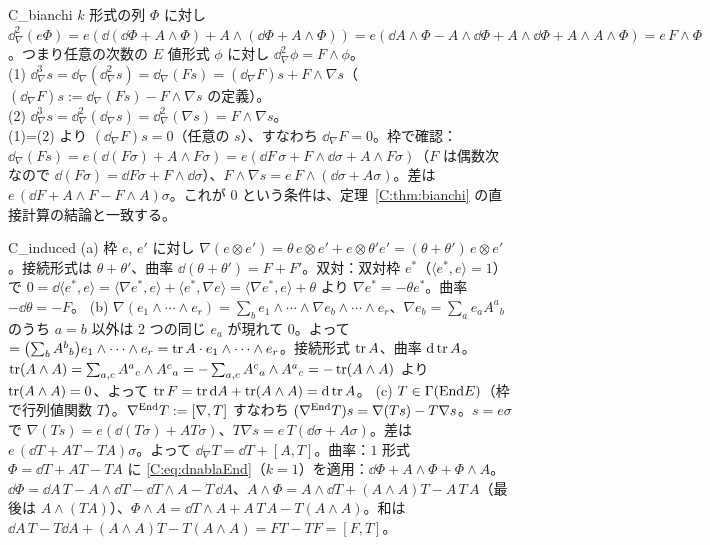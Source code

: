 \begin{soll}{C_bianchi}
$k$ 形式の列 $\Phi$ に対し $\dd_\nabla^2(e\Phi)=e(\dd(\dd\Phi+A\wedge\Phi)+A\wedge(\dd\Phi+A\wedge\Phi))=e(\dd A\wedge\Phi-A\wedge\dd\Phi+A\wedge\dd\Phi+A\wedge A\wedge\Phi)=e\,F\wedge\Phi$。つまり任意の次数の $E$ 値形式 $\phi$ に対し $\dd_\nabla^2\phi=F\wedge\phi$。\\
(1) $\dd_\nabla^3s=\dd_\nabla(\dd_\nabla^2s)=\dd_\nabla(Fs)=(\dd_\nabla F)s+F\wedge\nabla s$（$(\dd_\nabla F)s:=\dd_\nabla(Fs)-F\wedge\nabla s$ の定義）。\\
(2) $\dd_\nabla^3s=\dd_\nabla^2(\dd_\nabla s)=\dd_\nabla^2(\nabla s)=F\wedge\nabla s$。\\
(1)=(2) より $(\dd_\nabla F)s=0$（任意の $s$）、すなわち $\dd_\nabla F=0$。枠で確認：$\dd_\nabla(Fs)=e(\dd(F\sigma)+A\wedge F\sigma)=e(\dd F\,\sigma+F\wedge\dd\sigma+A\wedge F\sigma)$（$F$ は偶数次なので $\dd(F\sigma)=\dd F\sigma+F\wedge\dd\sigma$）、$F\wedge\nabla s=e\,F\wedge(\dd\sigma+A\sigma)$。差は $e\,(\dd F+A\wedge F-F\wedge A)\sigma$。これが $0$ という条件は、定理~\ref{C:thm:bianchi} の直接計算の結論と一致する。
\end{soll}

\begin{soll}{C_induced}
(a) 枠 $e$, $e'$ に対し $\nabla(e\otimes e')=\theta\,e\otimes e'+e\otimes\theta'e'=(\theta+\theta')\,e\otimes e'$。接続形式は $\theta+\theta'$、曲率 $\dd(\theta+\theta')=F+F'$。双対：双対枠 $e^*$（$\langle e^*,e\rangle=1$）で $0=\dd\langle e^*,e\rangle=\langle\nabla e^*,e\rangle+\langle e^*,\nabla e\rangle=\langle\nabla e^*,e\rangle+\theta$ より $\nabla e^*=-\theta e^*$。曲率 $-\dd\theta=-F$。
(b) $\nabla(e_1\wedge\cdots\wedge e_r)=\sum_be_1\wedge\cdots\wedge\nabla e_b\wedge\cdots\wedge e_r$、$\nabla e_b=\sum_ae_aA^a{}_b$ のうち $a=b$ 以外は 2 つの同じ $e_a$ が現れて $0$。よって $=\bigl(\sum_bA^b{}_b\bigr)e_1\wedge\cdots\wedge e_r=\operatorname{tr} A\cdot e_1\wedge\cdots\wedge e_r$。接続形式 $\operatorname{tr} A$、曲率 $\mathrm{d}\operatorname{tr} A$。$\operatorname{tr}(A\wedge A)=\sum_{a,c}A^a{}_c\wedge A^c{}_a=-\sum_{a,c}A^c{}_a\wedge A^a{}_c=-\operatorname{tr}(A\wedge A)$ より $\operatorname{tr}(A\wedge A)=0$、よって $\operatorname{tr} F=\operatorname{tr}\mathrm{d} A+\operatorname{tr}(A\wedge A)=\mathrm{d}\operatorname{tr} A$。
(c) $T\in\Gamma(\mathrm{End} E)$（枠で行列値関数 $T$）。$\nabla^{\mathrm{End}}T:=[\nabla,T]$ すなわち $(\nabla^{\mathrm{End}}T)s=\nabla(Ts)-T\nabla s$。$s=e\sigma$ で $\nabla(Ts)=e(\dd(T\sigma)+AT\sigma)$、$T\nabla s=e\,T(\dd\sigma+A\sigma)$。差は $e\,(\dd T+AT-TA)\sigma$。よって $\dd_\nabla T=\dd T+[A,T]$。曲率：$1$ 形式 $\Phi=\dd T+AT-TA$ に \eqref{C:eq:dnablaEnd}（$k=1$）を適用：$\dd\Phi+A\wedge\Phi+\Phi\wedge A$。
$\dd\Phi=\dd A\,T-A\wedge\dd T-\dd T\wedge A-T\,\dd A$、$A\wedge\Phi=A\wedge\dd T+(A\wedge A)T-A\,T\,A$（最後は $A\wedge(TA)$）、$\Phi\wedge A=\dd T\wedge A+A\,T\,A-T(A\wedge A)$。和は $\dd A\,T-T\dd A+(A\wedge A)T-T(A\wedge A)=FT-TF=[F,T]$。
\end{soll}

